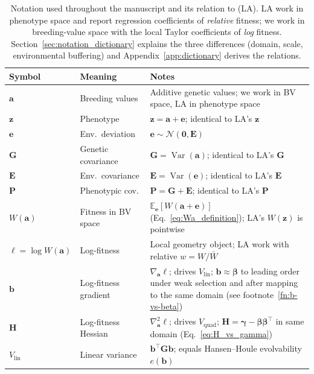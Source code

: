 \documentclass[9pt,twocolumn,twoside,lineno]{gsajnl}
\newcommand{\vect}[1]{\boldsymbol{#1}}
\newcommand{\mat}[1]{\mathbf{#1}}
\newcommand{\Vlin}{\ensuremath{V_{\text{lin}}}\xspace}
\newcommand{\Vquad}{\ensuremath{V_{\text{quad}}}\xspace}
\newcommand{\Var}{\ensuremath{\operatorname{Var}}\xspace}
\begin{document}
\begin{table}[H]
\centering
\caption{Notation used throughout the manuscript and its relation to \citet{LandeArnold1983} (LA). LA work in phenotype space and report regression coefficients of \emph{relative} fitness; we work in breeding-value space with the local Taylor coefficients of \emph{log} fitness. Section~\ref{sec:notation_dictionary} explains the three differences (domain, scale, environmental buffering) and Appendix~\ref{app:dictionary} derives the relations.}
\label{tab:notation}
\small
\begin{tabular}{@{}l p{1.9cm} p{4.0cm}@{}}
\toprule
Symbol & Meaning & Notes \\
\midrule
$\vect{a}$ & Breeding values & Additive genetic values; we work in BV space, LA in phenotype space \\
$\vect{z}$ & Phenotype & $\vect{z} = \vect{a} + \vect{e}$; identical to LA's $\vect{z}$ \\
$\vect{e}$ & Env.\ deviation & $\vect{e} \sim \mathcal{N}(\vect{0}, \mat{E})$ \\
$\mat{G}$ & Genetic covariance & $\mat{G} = \Var(\vect{a})$; identical to LA's $\mat{G}$ \\
$\mat{E}$ & Env.\ covariance & $\mat{E} = \Var(\vect{e})$; identical to LA's $\mat{E}$ \\
$\mat{P}$ & Phenotypic cov. & $\mat{P} = \mat{G} + \mat{E}$; identical to LA's $\mat{P}$ \\
$W(\vect{a})$ & Fitness in BV space & $\mathbb{E}_{\vect{e}}[W(\vect{a}+\vect{e})]$ (Eq.~\ref{eq:Wa_definition}); LA's $W(\vect{z})$ is pointwise \\
$\ell = \log W(\vect{a})$ & Log-fitness & Local geometry object; LA work with relative $w = W/\bar{W}$ \\
$\vect{b}$ & Log-fitness gradient & $\nabla_{\vect{a}} \ell$; drives $\Vlin$; $\vect{b}\approx\bm{\beta}$ to leading order under weak selection and after mapping to the same domain (see footnote~\ref{fn:b-vs-beta}) \\
$\mat{H}$ & Log-fitness Hessian & $\nabla^2_{\vect{a}} \ell$; drives $\Vquad$; $\mat{H} = \bm{\gamma}-\bm{\beta}\bm{\beta}^{\top}$ in same domain (Eq.~\ref{eq:H_vs_gamma}) \\
$\Vlin$ & Linear variance & $\vect{b}^\top \mat{G} \vect{b}$; equals Hansen--Houle evolvability $e(\vect{b})$ \\

\end{tabular}
\end{table}
\end{document}

